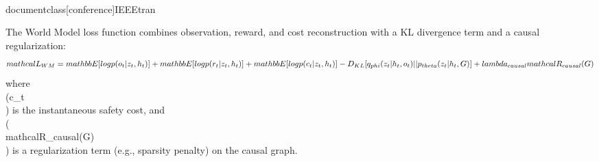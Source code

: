 \\documentclass[conference]{IEEEtran}
\begin{document}
The World Model loss function combines observation, reward, and cost reconstruction with a KL divergence term and a causal regularization:
$$
\\mathcal{L}_{WM} = \\mathbb{E}[\\log p(o_t | z_t, h_t)] + \\mathbb{E}[\\log p(r_t | z_t, h_t)] + \\mathbb{E}[\\log p(c_t | z_t, h_t)] - D_{KL}[q_{\\phi}(z_t | h_t, o_t) || p_{\\theta}(z_t | h_t, G)] + \\lambda_{causal} \\mathcal{R}_{causal}(G)
$$
where \\(c_t\\) is the instantaneous safety cost, and \\(\\mathcal{R}_{causal}(G)\\) is a regularization term (e.g., sparsity penalty) on the causal graph.
\end{document}
